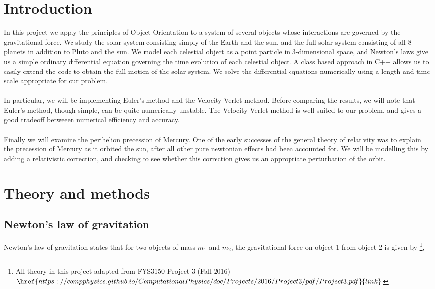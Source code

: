 \documentclass[%
 reprint,
 nobalance,
 amsmath,amssymb,
 aps,
]{revtex4-1}
\begin{document}
\section{\label{sec:Int}Introduction}
In this project we apply the principles of Object Orientation to a system of several objects whose interactions are governed by the gravitational force. We study the solar system consisting simply of the Earth and the sun, and the full solar system consisting of all 8 planets in addition to Pluto and the sun. We model each celestial object as a point particle in 3-dimensional space, and Newton's laws give us a simple ordinary differential equation governing the time evolution of each celestial object. A class based approach in C++ allows us to easily extend the code to obtain the full motion of the solar system. We solve the differential equations numerically using a length and time scale appropriate for our problem. \\ \\
In particular, we will be implementing Euler's method and the Velocity Verlet method. Before comparing the results, we will note that Euler's method, though simple, can be quite numerically unstable. The Velocity Verlet method is well suited to our problem, and gives a good tradeoff betweeen numerical efficiency and accuracy. \\ \\
Finally we will examine the perihelion precession of Mercury. One of the early successes of the general theory of relativity was to explain the precession of Mercury as it orbited the sun, after all other pure newtonian effects had been accounted for. We will be modelling this by adding a relativistic correction, and checking to see whether this correction gives us an appropriate perturbation of the orbit.

\section{\label{sec:The}Theory and methods}

\subsection{\label{sec:New}Newton's law of gravitation}
Newton's law of gravitation states that for two objects of mass $m_1$ and $m_2$, the gravitational force on object 1 from object 2 is given by \footnote{All theory in this project adapted from FYS3150 Project 3 (Fall 2016) $\href{https://compphysics.github.io/ComputationalPhysics/doc/Projects/2016/Project3/pdf/Project3.pdf}{link}$},
\end{document}
